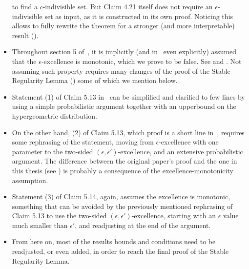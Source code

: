 \begin{itemize}
            to find a $c$-indivisible set.
            But Claim 4.21 itself does not require an $\epsilon$-indivisible set as input, as it is constructed in its
            own proof.
            Noticing this allows to fully rewrite the theorem for a stronger (and more interpretable) result
            ().
        \item Throughout section 5 of~\cite{regularity_lemmas_for_stable_graphs}, it is implicitly
            (and in~\cite{notes_on_the_stable_regularity_lemma} even explicitly) assumed that the $\epsilon$-excellence
            is monotonic, which we prove to be false.
            See  and .
            Not assuming such property requires many changes of the proof of the Stable Regularity Lemma
            () some of which we mention below.
        \item Statement (1) of Claim 5.13 in~\cite{regularity_lemmas_for_stable_graphs} can be simplified and clarified
            to few lines by using a simple probabilistic argument together with an upperbound on the hypergeometric
            distribution.
        \item On the other hand, (2) of Claim 5.13,
            which proof is a short line in~\cite{regularity_lemmas_for_stable_graphs}, requires some rephrasing of the
            statement, moving from $\epsilon$-excellence with one parameter to the two-sided $(\epsilon, \epsilon')$-excellence,
            and an extensive probabilistic argument.
            The difference between the original paper's proof and the one in this thesis
            (see ) is probably a consequence of the excellence-monotonicity assumption.
        \item Statement (3) of Claim 5.14, again, assumes the excellence is monotonic, something that can be avoided
            by the previously mentioned rephrasing of Claim 5.13 to use the two-sided $(\epsilon, \epsilon')$-excellence, starting with
            an $\epsilon$ value much smaller than $\epsilon'$, and readjusting at the end of the argument.
        \item From here on, most of the results bounds and conditions need to be readjusted, or even added,
            in order to reach the final proof of the Stable Regularity Lemma.

    \end{itemize}

